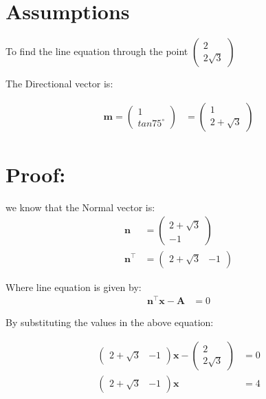 \documentclass[journal,10pt,twocolumn]{article}
\let\vec\mathbf
\newcommand{\myvec}[1]{\ensuremath{\begin{pmatrix}#1\end{pmatrix}}}
\begin{document}
\section{Assumptions}
To find the line equation  through the point $\myvec{2\\2\sqrt{3}}$
\vspace*{3mm}

 The Directional vector is:

\begin{align}
\vec{m}=\myvec{1\\tan75^\circ}
	&=\myvec{1\\2+\sqrt{3}}
\end{align}
  
\section{Proof:}
we know that the Normal vector is:
\begin{align}
	\vec{n}&=\myvec{2+\sqrt{3}\\-1}\\
	\vec{n}^\top&=\myvec{2+\sqrt{3}&-1}	
\end{align}






Where line equation  is given by:
\begin{align}
	\vec{n}^\top \vec{{\vec{x}-\vec{A}}} &= 0
\end{align}

By substituting the values in the above equation:



\begin{align}
	\myvec{2+\sqrt{3} &-1}\vec{x}-\myvec{2\\2\sqrt{3}}&=0\\
	\myvec{2+\sqrt{3}&-1}\vec{x}&=4
\end{align}
\end{document}
